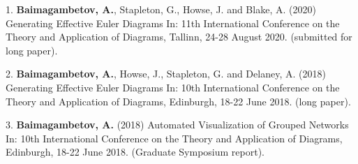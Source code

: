 \documentclass[a4paper,11pt]{article} %
\begin{document}
1. \textbf{Baimagambetov, A.}, Stapleton, G., Howse, J. and Blake, A. (2020)
Generating Effective Euler Diagrams In:
11th International Conference on the Theory and Application of Diagrams, Tallinn, 24-28 August 2020.
(submitted for long paper).

2. \textbf{Baimagambetov, A.}, Howse, J., Stapleton, G. and Delaney, A. (2018)
Generating Effective Euler Diagrams In:
10th International Conference on the Theory and Application of Diagrams, Edinburgh, 18-22 June 2018.
(long paper).

3. \textbf{Baimagambetov, A.} (2018)
Automated Visualization of Grouped Networks In:
10th International Conference on the Theory and Application of Diagrams, Edinburgh, 18-22 June 2018.
(Graduate Symposium report).
\end{document}
